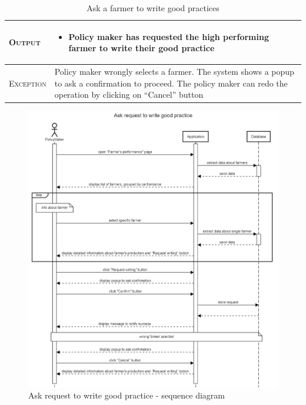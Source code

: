 \begin{table}[H]
\begin{tabular}{|l|p{}|}
    	\hline %
    	\textsc{Output}             &  \begin{itemize}
    	    \item Policy maker has requested the high performing farmer to write their good practice
    	\end{itemize}\\
    	\hline %
    	\textsc{Exception}         &  Policy maker wrongly selects a farmer. The 
    	system shows a popup to ask a confirmation to proceed. The policy maker can redo the operation by clicking on “Cancel” button\\
    	\hline %
        
    \end{tabular}
    \caption{\label{tab:visualize_iprovement}Ask a farmer to write good practices} 
\end{table}

\begin{figure}[H]
    \centering
    \includegraphics[scale=0.5]{Images/Sequence diagrams/SE2 - Ask request to write good practice (pm).png}
    \caption{Ask request to write good practice - sequence diagram}
    \label{fig:my_label}
\end{figure}